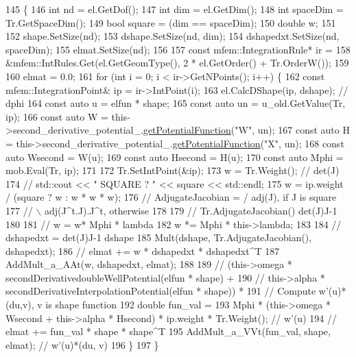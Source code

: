 \begin{DoxyCode}
145                             \{
146   \textcolor{keywordtype}{int} nd = el.GetDof();
147   \textcolor{keywordtype}{int} dim = el.GetDim();
148   \textcolor{keywordtype}{int} spaceDim = Tr.GetSpaceDim();
149   \textcolor{keywordtype}{bool} square = (dim == spaceDim);
150   \textcolor{keywordtype}{double} w;
151 
152   shape.SetSize(nd);
153   dshape.SetSize(nd, dim);
154   dshapedxt.SetSize(nd, spaceDim);
155   elmat.SetSize(nd);
156 
157   \textcolor{keyword}{const} mfem::IntegrationRule* ir =
158       &mfem::IntRules.Get(el.GetGeomType(), 2 * el.GetOrder() + Tr.OrderW());
159 
160   elmat = 0.0;
161   \textcolor{keywordflow}{for} (\textcolor{keywordtype}{int} i = 0; i < ir->GetNPoints(); i++) \{
162     \textcolor{keyword}{const} mfem::IntegrationPoint& ip = ir->IntPoint(i);
163     el.CalcDShape(ip, dshape);  \textcolor{comment}{// dphi}
164     \textcolor{keyword}{const} \textcolor{keyword}{auto} u = elfun * shape;
165     \textcolor{keyword}{const} \textcolor{keyword}{auto} un = u\_old.GetValue(Tr, ip);
166     \textcolor{keyword}{const} \textcolor{keyword}{auto} W = this->second\_derivative\_potential\_.\hyperlink{classPotentialFunctions_a63a86cbadc57d531e0c0fa987ac9fea6}{getPotentialFunction}(\textcolor{stringliteral}{"W"}, un);
167     \textcolor{keyword}{const} \textcolor{keyword}{auto} H = this->second\_derivative\_potential\_.\hyperlink{classPotentialFunctions_a63a86cbadc57d531e0c0fa987ac9fea6}{getPotentialFunction}(\textcolor{stringliteral}{"X"}, un);
168     \textcolor{keyword}{const} \textcolor{keyword}{auto} Wsecond = W(u);
169     \textcolor{keyword}{const} \textcolor{keyword}{auto} Hsecond = H(u);
170     \textcolor{keyword}{const} \textcolor{keyword}{auto} Mphi = mob.Eval(Tr, ip);
171 
172     Tr.SetIntPoint(&ip);
173     w = Tr.Weight();  \textcolor{comment}{// det(J)}
174     \textcolor{comment}{// std::cout << " SQUARE  ? " << square << std::endl;}
175     w = ip.weight / (square ? w : w * w * w);
176     \textcolor{comment}{// AdjugateJacobian = / adj(J),         if J is square}
177     \textcolor{comment}{//                    \(\backslash\) adj(J^t.J).J^t, otherwise}
178 
179     \textcolor{comment}{// Tr.AdjugateJacobian() det(J)J-1}
180 
181     \textcolor{comment}{// w = w* Mphi * lambda}
182     w *= Mphi * this->lambda;
183 
184     \textcolor{comment}{// dshapedxt =  det(J)J-1 dshape}
185     Mult(dshape, Tr.AdjugateJacobian(), dshapedxt);
186     \textcolor{comment}{// elmat += w * dshapedxt * dshapedxt^T}
187     AddMult\_a\_AAt(w, dshapedxt, elmat);
188 
189     \textcolor{comment}{//  (this->omega * secondDerivativedoubleWellPotential(elfun * shape) +}
190     \textcolor{comment}{//   this->alpha * secondDerivativeInterpolationPotential(elfun * shape)) *}
191     \textcolor{comment}{// Compute w'(u)*(du,v), v is shape function}
192     \textcolor{keywordtype}{double} fun\_val =
193         Mphi * (this->omega * Wsecond + this->alpha * Hsecond) * ip.weight * Tr.Weight();  \textcolor{comment}{// w'(u)}
194     \textcolor{comment}{// elmat += fun\_val * shape * shape^T}
195     AddMult\_a\_VVt(fun\_val, shape, elmat);  \textcolor{comment}{// w'(u)*(du, v)}
196   \}
197 \}
\end{DoxyCode}
